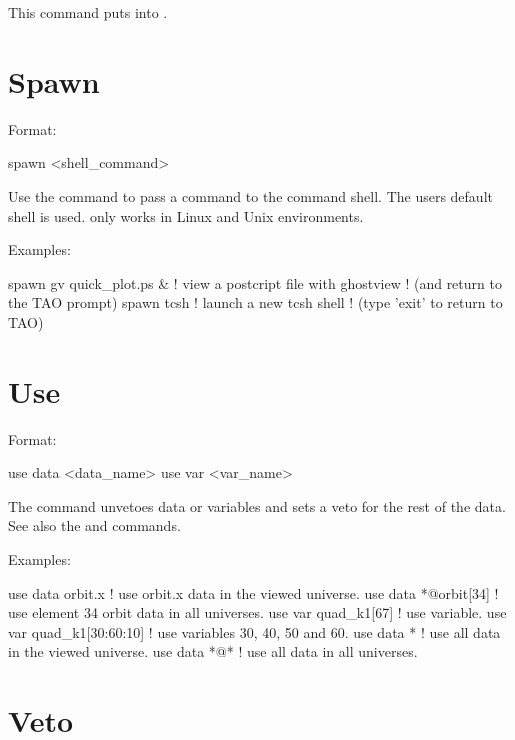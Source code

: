 {{\vskip 0.2in 
This command puts \tao into . 

\section{Spawn}
\label{s:spawn}

Format:
\begin{example}
  spawn <shell_command>
\end{example}

\vskip 0.2in
Use the  command to pass a command to the command shell.  The users
default shell is used.  only works in Linux and Unix environments.

Examples:
\begin{example}
  spawn gv quick_plot.ps &      ! view a postcript file with ghostview
                                ! (and return to the TAO prompt)
  spawn tcsh                    ! launch a new tcsh shell 
                                ! (type 'exit' to return to TAO)
\end{example}

\section{Use}
\label{s:use}

Format:
\begin{example}
  use data  <data_name>
  use var <var_name>
\end{example}

\vskip 0.2in 
The  command unvetoes data or variables and sets a veto for
the rest of the data. See also the  and 
commands.

Examples:
\begin{example}
  use data orbit.x             ! use orbit.x data in the viewed universe.
  use data *@orbit[34]         ! use element 34 orbit data in all universes.
  use var quad_k1[67]          ! use variable.
  use var quad_k1[30:60:10]    ! use variables 30, 40, 50 and 60.
  use data *                   ! use all data in the viewed universe.
  use data *@*                 ! use all data in all universes.
\end{example}


\section{Veto}
\label{s:veto}

}}
